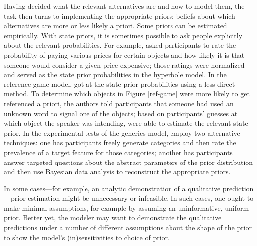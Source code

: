 \documentclass{sp}
\newcommand{\gcs}[1]{\textcolor{blue}{[gcs: #1]}}
\newcommand{\mf}[1]{\textcolor{orange}{[mf: #1]}}
\newcommand{\mht}[1]{\textcolor{purple}{[mht: #1]}}
\begin{document}
Having decided what the relevant alternatives are and how to model them, the task then turns to implementing the appropriate priors: beliefs about which alternatives are more or less likely a priori. Some priors can be estimated empirically. With state priors, it is sometimes possible to ask people explicitly about the relevant probabilities. For example, \cite{kaoetal2014} asked participants to rate the probability of paying various prices for certain objects and how likely it is that someone would consider a given price expensive; those ratings were normalized and served as the state prior probabilities in the hyperbole model. In the reference game model, \cite{frankgoodman2012} got at the state prior probabilities using a less direct method. To determine which objects in Figure \ref{ref-game} were more likely to get referenced a priori, the authors told participants that someone had used an unknown word to signal one of the objects; based on participants' guesses at which object the speaker was intending, \citeauthor{frankgoodman2012} were able to estimate the relevant state prior.
In the experimental tests of the generics model, \cite{tesslergoodman2019} employ two alternative techniques: one has participants freely generate categories and then rate the prevalence of a target feature for those categories; another has participants answer targeted questions about the abstract parameters of the prior distribution and then use Bayesian data analysis to reconstruct the appropriate priors. %


In some cases---for example, an analytic demonstration of a qualitative prediction---prior estimation might be unnecessary or infeasible. In such cases, one ought to make minimal assumptions, for example by assuming an uninformative, uniform prior. Better yet, the modeler may want to demonstrate the qualitative predictions under a number of different assumptions about the shape of the prior to show the model's (in)sensitivities to choice of prior.

\end{document}
